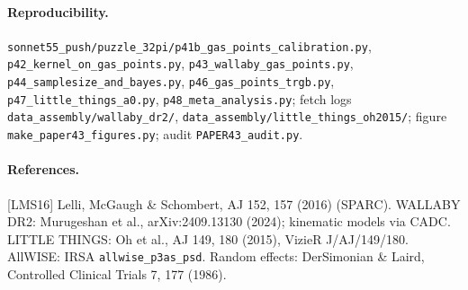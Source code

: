 \documentclass[10pt]{article}
\newcommand{\fpath}[1]{\nolinkurl{#1}}
\begin{document}
\paragraph{Reproducibility.} \fpath{sonnet55_push/puzzle_32pi/p41b_gas_points_calibration.py}, \fpath{p42_kernel_on_gas_points.py}, \fpath{p43_wallaby_gas_points.py}, \fpath{p44_samplesize_and_bayes.py}, \fpath{p46_gas_points_trgb.py}, \fpath{p47_little_things_a0.py}, \fpath{p48_meta_analysis.py}; fetch logs \fpath{data_assembly/wallaby_dr2/}, \fpath{data_assembly/little_things_oh2015/}; figure \fpath{make_paper43_figures.py}; audit \fpath{PAPER43_audit.py}.

\small
\paragraph{References.}
[LMS16] Lelli, McGaugh \& Schombert, AJ 152, 157 (2016) (SPARC).
WALLABY DR2: Murugeshan et al., arXiv:2409.13130 (2024); kinematic models via CADC.
LITTLE THINGS: Oh et al., AJ 149, 180 (2015), VizieR J/AJ/149/180.
AllWISE: IRSA \texttt{allwise\_p3as\_psd}.
Random effects: DerSimonian \& Laird, Controlled Clinical Trials 7, 177 (1986).
\end{document}

